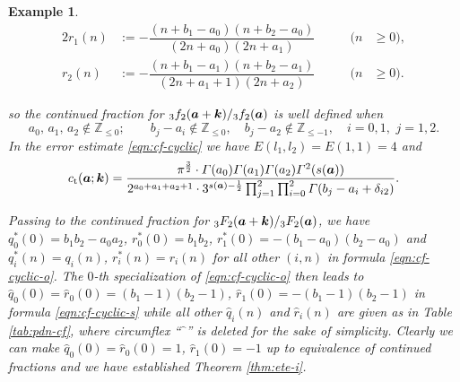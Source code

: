 \documentclass[a4paper,12pt]{article}
\theoremstyle{plain}
\newtheorem{example}[theorem]{Example}
\def\rt{\mathrm{t}}
\def\Z{\mathbb{Z}}
\def\vG{\varGamma}
\def\ba{\mbox{\boldmath $a$}}
\def\sba{\mbox{\boldmath ${\scriptstyle a}$}}
\def\bk{\mbox{\boldmath $k$}}
\begin{document}
\begin{example}
\begin{table}[t]
\begin{alignat*}{2}
r_1(n) &:= - \dfrac{(n+b_1-a_0)(n+b_2-a_0)}{(2 n+a_0)(2 n+a_1)} 
\qquad & (n &\ge 0),  \\[2mm]
r_2(n) &:= - \dfrac{(n+b_1-a_1)(n+b_2-a_1)}{(2 n+a_1+1)(2 n+a_2)} 
\qquad & (n &\ge 0).   
\end{alignat*}
\caption{Partial denominators and numerators in Example \ref{ex:1} with $r_0(0) := 1$.} 
\label{tab:pdn-ex1}
\end{table} 
so the continued fraction for ${}_3 f_2(\ba+\bk)/{}_3f_2(\ba)$ is well defined when 
\[
a_0, \, a_1, \, a_2 \not \in \Z_{\le 0}; \qquad 
b_j -a_i \not\in \Z_{\le 0}, \quad b_j-a_2 \not\in \Z_{\le -1}, \quad  
i = 0, 1, \,\, j = 1, 2.    
\]
In the error estimate \eqref{eqn:cf-cyclic} we have $E(l_1, l_2) = E(1,1) = 4$ and 
\[
c_{\rt}(\ba; \bk) = \dfrac{\pi^{\frac{3}{2}} \cdot 
\vG(a_0) \vG(a_1) \vG(a_2) \vG^2(s(\ba))}{2^{a_0+a_1+a_2+1} \cdot 3^{s(\sba) - \frac{1}{2}} 
\prod_{j=1}^2 \prod_{i=0}^2 \vG(b_j-a_i + \delta_{i 2})}.    
\]
\par
Passing to the continued fraction for ${}_3 F_2(\ba+\bk)/{}_3F_2(\ba)$, 
we have $q_0^*(0) = b_1 b_2-a_0 a_2$, $r^*_0(0) = b_1 b_2$,  
$r^*_1(0) = -(b_1-a_0)(b_2-a_0)$ and $q^*_i(n) = q_i(n)$, $r^*_i(n) = r_i(n)$ 
for all other $(i, n)$ in formula \eqref{eqn:cf-cyclic-o}.   
The $0$-th specialization of \eqref{eqn:cf-cyclic-o} then leads to 
$\hat{q}_0(0) = \hat{r}_0(0) = (b_1-1)(b_2-1)$, $\hat{r}_1(0) = -(b_1-1)(b_2-1)$ 
in formula \eqref{eqn:cf-cyclic-s} while all other $\hat{q}_i(n)$ and 
$\hat{r}_i(n)$ are given as in Table \ref{tab:pdn-cf}, where circumflex 
``$\hat{\phantom{q}}$'' is deleted for the sake of simplicity. 
Clearly we can make $\hat{q}_0(0) = \hat{r}_0(0) = 1$, $\hat{r}_1(0) = -1$ 
up to equivalence of continued fractions and we have established      
Theorem \ref{thm:ete-i}. 
\end{example}
\end{document}
